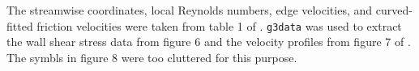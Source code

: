 The streamwise coordinates, local Reynolds numbers, edge velocities, and
curved-fitted friction velocities were taken from table 1 of
\citet{SchultzGrunowF+1940+deu+JOUR}.  \texttt{g3data} was used to extract the
wall shear stress data from figure 6 and the velocity profiles from figure 7 of
\citet{SchultzGrunowF+1940+deu+JOUR}.  The symbls in figure 8 were too
cluttered for this purpose.
